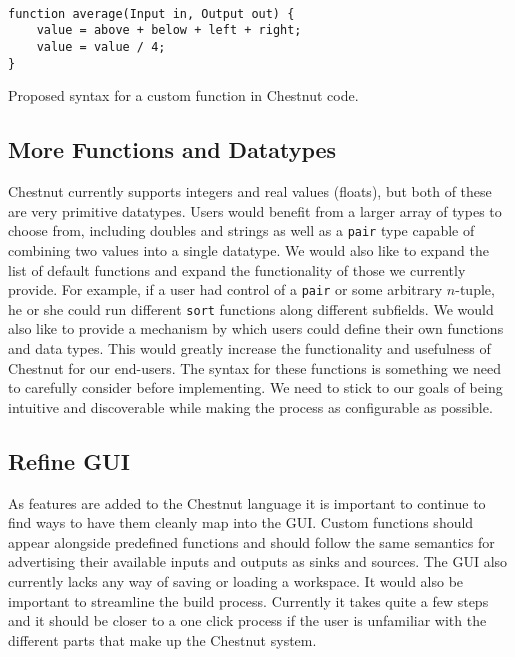\documentclass[twocolumn]{article}
\renewcommand{\|}{\origbar} %
\newcommand{\code}[1]{\texttt{#1}}
\begin{document}
\begin{Code Snippet}
\begin{verbatim}

function average(Input in, Output out) {
    value = above + below + left + right;
    value = value / 4;
}
\end{verbatim}
\caption{Proposed syntax for a custom function in Chestnut code.}
\label{code:customFunction}
\end{Code Snippet}


\subsection{More Functions and Datatypes}

Chestnut currently supports integers and real values (floats), but both of these are very primitive datatypes. Users would benefit from a larger array of types to choose from, including doubles and strings as well as a \code{pair} type capable of combining two values into a single datatype. We would also like to expand the list of default functions and expand the functionality of those we currently provide. For example, if a user had control of a \code{pair} or some arbitrary $n$-tuple, he or she could run different \code{sort} functions along different subfields. We would also like to provide a mechanism by which users could define their own functions and data types. This would greatly increase the functionality and usefulness of Chestnut for our end-users. The syntax for these functions is something we need to carefully consider before implementing. We need to stick to our goals of being intuitive and discoverable while making the process as configurable as possible.

\subsection{Refine GUI}

As features are added to the Chestnut language it is important to continue to find ways to have them cleanly map into the GUI. Custom functions should appear alongside predefined functions and should follow the same semantics for advertising their available inputs and outputs as sinks and sources. The GUI also currently lacks any way of saving or loading a workspace. It would also be important to streamline the build process. Currently it takes quite a few steps and it should be closer to a one click process if the user is unfamiliar with the different parts that make up the Chestnut system.
\end{document}
